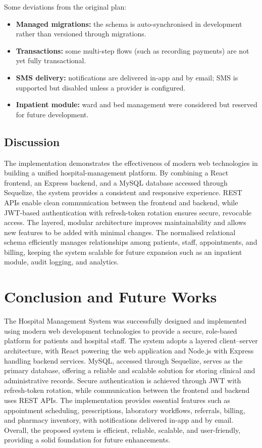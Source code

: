 \documentclass[12pt,a4paper]{report}
\begin{document}
Some deviations from the original plan:
\begin{itemize}[leftmargin=1.4em]
  \item \textbf{Managed migrations:} the schema is auto-synchronised in development
        rather than versioned through migrations.
  \item \textbf{Transactions:} some multi-step flows (such as recording payments) are
        not yet fully transactional.
  \item \textbf{SMS delivery:} notifications are delivered in-app and by email; SMS is
        supported but disabled unless a provider is configured.
  \item \textbf{Inpatient module:} ward and bed management were considered but reserved
        for future development.
\end{itemize}

\section{Discussion}
The implementation demonstrates the effectiveness of modern web technologies in
building a unified hospital-management platform. By combining a React frontend, an
Express backend, and a MySQL database accessed through Sequelize, the system provides a
consistent and responsive experience. REST APIs enable clean communication between the
frontend and backend, while JWT-based authentication with refresh-token rotation ensures
secure, revocable access. The layered, modular architecture improves maintainability and
allows new features to be added with minimal changes. The normalised relational schema
efficiently manages relationships among patients, staff, appointments, and billing,
keeping the system scalable for future expansion such as an inpatient module, audit
logging, and analytics.

\chapter{Conclusion and Future Works}
The Hospital Management System was successfully designed and implemented using modern
web development technologies to provide a secure, role-based platform for patients and
hospital staff. The system adopts a layered client--server architecture, with React
powering the web application and Node.js with Express handling backend services. MySQL,
accessed through Sequelize, serves as the primary database, offering a reliable and
scalable solution for storing clinical and administrative records. Secure authentication
is achieved through JWT with refresh-token rotation, while communication between the
frontend and backend uses REST APIs. The implementation provides essential features such
as appointment scheduling, prescriptions, laboratory workflows, referrals, billing, and
pharmacy inventory, with notifications delivered in-app and by email. Overall, the
proposed system is efficient, reliable, scalable, and user-friendly, providing a solid
foundation for future enhancements.
\end{document}
